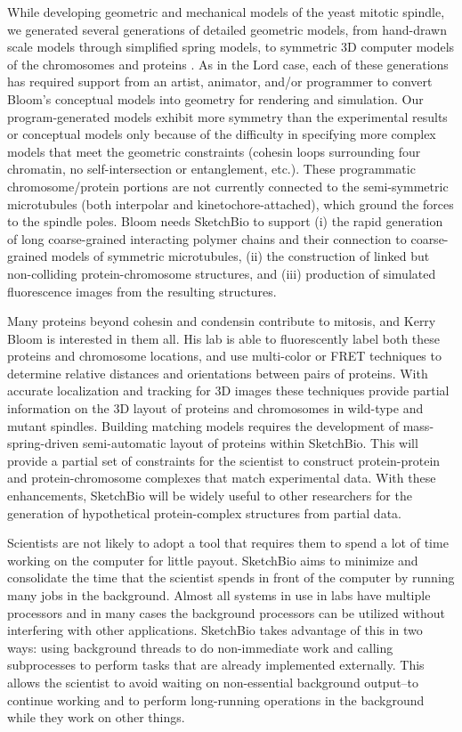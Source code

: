 \documentclass{article} %
\begin{document}
While developing geometric and mechanical models of the yeast mitotic spindle, we generated several generations of detailed geometric models, from hand-drawn scale models through simplified spring models, to symmetric 3D computer models of the chromosomes and proteins \cite{taylorBookChapter}.  As in the Lord case, each of these generations has required support from an artist, animator, and/or programmer to convert Bloom's conceptual models into geometry for rendering and simulation.  Our program-generated models exhibit more symmetry than the experimental results or conceptual models only because of the difficulty in specifying more complex models that meet the geometric constraints (cohesin loops surrounding four chromatin, no self-intersection or entanglement, etc.).  These programmatic chromosome/protein portions are not currently connected to the semi-symmetric microtubules (both interpolar and kinetochore-attached), which ground the forces to the spindle poles.  Bloom needs SketchBio to support (i) the rapid generation of long coarse-grained interacting polymer chains and their connection to coarse-grained models of symmetric microtubules, (ii) the construction of linked but non-colliding protein-chromosome structures, and (iii) production of simulated fluorescence images from the resulting structures.

Many proteins beyond cohesin and condensin contribute to mitosis, and Kerry Bloom is interested in them all.  His lab is able to fluorescently label both these proteins and chromosome locations, and use multi-color or FRET techniques to determine relative distances and orientations between pairs of proteins.  With accurate localization and tracking for 3D images these techniques provide partial information on the 3D layout of proteins and chromosomes in wild-type and mutant spindles.  Building matching models requires the development of mass-spring-driven semi-automatic layout of proteins within SketchBio.  This will provide a partial set of constraints for the scientist to construct protein-protein and protein-chromosome complexes that match experimental data.  With these enhancements, SketchBio will be widely useful to other researchers for the generation of hypothetical protein-complex structures from partial data.

Scientists are not likely to adopt a tool that requires them to spend a lot of time working on the computer for little payout.  SketchBio aims to minimize and consolidate the time that the scientist spends in front of the computer by running many jobs in the background.  Almost all systems in use in labs have multiple processors and in many cases the background processors can be utilized without interfering with other applications.  SketchBio takes advantage of this in two ways: using background threads to do non-immediate work and calling subprocesses to perform tasks that are already implemented externally.  This allows the scientist to avoid waiting on non-essential background output--to continue working and to perform long-running operations in the background while they work on other things.
\end{document}
